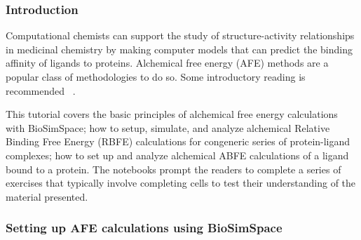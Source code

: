 
\subsubsection{Introduction}


Computational chemists can support the study of structure-activity relationships in medicinal chemistry by making computer models that can predict the binding affinity of ligands to proteins. Alchemical free energy (AFE) methods are a popular class of methodologies to do so. Some
introductory reading is recommended ~\cite{mey2020best, cournia_allen_sherman_2017, kuhn_firth-clark_tosco_mey_mackey_michel_2020, Hahn2022}.

This tutorial covers the basic principles of alchemical free energy calculations with BioSimSpace; how to setup, simulate, and analyze alchemical Relative Binding Free Energy (RBFE) calculations for congeneric series of protein-ligand complexes; how to set up and analyze alchemical ABFE calculations of a ligand bound to a protein.  
The notebooks prompt the readers to complete a series of exercises that typically involve completing cells to test their understanding of the material presented. 

\subsubsection{Setting up AFE calculations using BioSimSpace}

